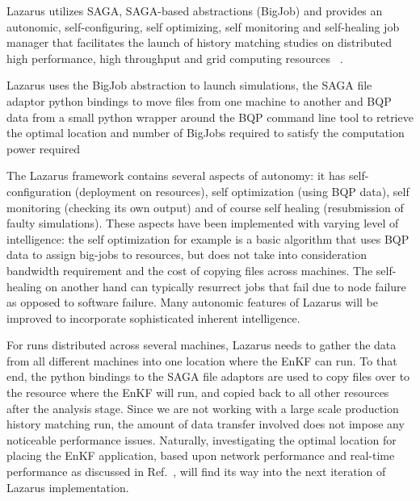 \documentclass{rspublic}
\newcommand{\up}{\vspace*{-0.3em}}
\begin{document}

Lazarus utilizes SAGA, SAGA-based abstractions (BigJob) and provides
an autonomic, self-configuring, self optimizing, self monitoring and
self-healing job manager that facilitates the launch of history
matching studies on distributed high performance, high throughput and
grid computing resources ~\citep{gmac}.

Lazarus uses the BigJob abstraction to launch simulations,
the SAGA file adaptor python bindings to move files from one machine
to another and BQP data from a small python wrapper around the BQP
command line tool to retrieve the optimal location and number of
BigJobs required to satisfy the computation power required

The Lazarus framework contains several aspects of autonomy: it has
self-configuration (deployment on resources), self optimization (using
BQP data), self monitoring (checking its own output) and of course
self healing (resubmission of faulty simulations). These aspects have
been implemented with varying level of intelligence: the self
optimization for example is a basic algorithm that uses BQP data to
assign big-jobs to resources, but does not take into consideration
bandwidth requirement and the cost of copying files across
machines. The self-healing on another hand can typically resurrect
jobs that fail due to node failure as opposed to software
failure. Many autonomic features of Lazarus will be improved to
incorporate sophisticated inherent intelligence.

For runs distributed across several machines, Lazarus needs to gather
the data from all different machines into one location where the EnKF
can run. To that end, the python bindings to the SAGA file adaptors
are used to copy files over to the resource where the EnKF will run,
and copied back to all other resources after the analysis stage. Since
we are not working with a large scale production history matching run,
the amount of data transfer involved does not impose any noticeable
performance issues. Naturally, investigating the optimal location for
placing the EnKF application, based upon network performance and
real-time performance as discussed in Ref.~\cite{escience07}, will
find its way into the next iteration of Lazarus implementation.
\end{document}
